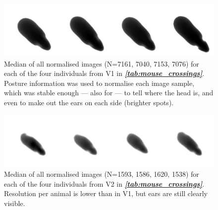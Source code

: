 \documentclass[9pt,lineno]{elife}
\newcommand{\tableref}[1]{\textit{\textbf{\ref{tab:#1}}}\xspace}
\newcommand{\TRex}{\protect\path{TRex}}
\newcommand{\changemade}[1]{#1}
\begin{document}
\begin{figure}
\begin{fullwidth}
\includegraphics[width=1.0\linewidth]{figures/mice_image.pdf}
\caption{\changemade{Median of all normalised images (N=7161, 7040, 7153, 7076) for each of the four individuals from V1 in \tableref{mouse_crossings}. Posture information was used to normalise each image sample, which was stable enough — also for \TRex{} — to tell where the head is, and even to make out the ears on each side (brighter spots).}}
\label{fig:mice_image}
\end{fullwidth}
\end{figure}

\begin{figure}
\begin{fullwidth}
\includegraphics[width=1.0\linewidth]{figures/mice_camera_image.pdf}
\caption{\changemade{Median of all normalised images (N=1593, 1586, 1620, 1538) for each of the four individuals from V2 in \tableref{mouse_crossings}. Resolution per animal is lower than in V1, but ears are still clearly visible.}}
\label{fig:mice_camera_image}
\end{fullwidth}
\end{figure}
\end{document}
